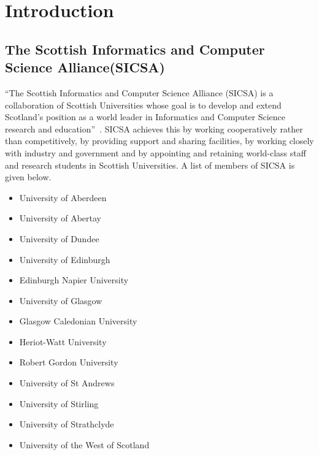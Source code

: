 


\chapter{Introduction}

\section{The Scottish Informatics and Computer Science Alliance(SICSA)}

``The Scottish Informatics and Computer Science Alliance (SICSA) is a collaboration of Scottish Universities whose goal is to develop 
and extend Scotland's position as a world leader in Informatics and Computer Science research and education''~\cite{sicsa}. 
SICSA achieves this by working cooperatively rather than competitively, by providing support and sharing facilities, by working closely 
with industry and government and by appointing and retaining world-class staff and research students in Scottish Universities.
A list of members of SICSA is given below.

\begin{itemize}
 \item University of Aberdeen
 \item University of Abertay
 \item University of Dundee
 \item University of Edinburgh
 \item Edinburgh Napier University
 \item University of Glasgow
 \item Glasgow Caledonian University
 \item Heriot-Watt University
 \item Robert Gordon University
 \item University of St Andrews
 \item University of Stirling
 \item University of Strathclyde
 \item University of the West of Scotland
\end{itemize}

